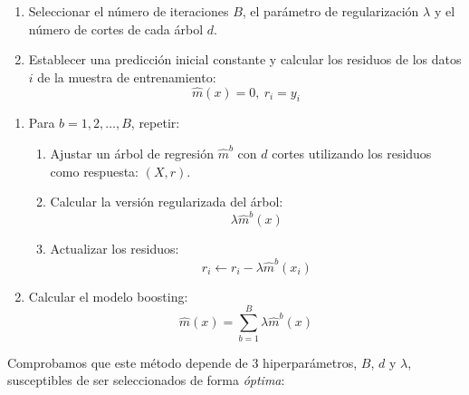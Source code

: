 \documentclass[
]{book}
\theoremstyle{break}
\theoremstyle{nonumberplain}
\begin{document}
\begin{enumerate}
\def\labelenumi{\arabic{enumi}.}
\item
  Seleccionar el número de iteraciones \(B\), el parámetro de regularización \(\lambda\) y el número de cortes de cada árbol \(d\).
\item
  Establecer una predicción inicial constante y calcular los residuos de los datos \(i\) de la muestra de entrenamiento: \[\hat m (x) = 0, \ r_i = y_i\]
\end{enumerate}

\begin{enumerate}
\def\labelenumi{\arabic{enumi}.}
\item
  Para \(b = 1, 2,\ldots, B\), repetir:

  \begin{enumerate}
  \def\labelenumii{\alph{enumii}.}
  \item
    Ajustar un árbol de regresión \(\hat m^b\) con \(d\) cortes utilizando los residuos como respuesta: \((X, r)\).
  \item
    Calcular la versión regularizada del árbol:
    \[\lambda \hat m^b (x)\]
  \item
    Actualizar los residuos:
    \[r_i \leftarrow r_i - \lambda \hat m^b (x_i)\]
  \end{enumerate}
\item
  Calcular el modelo boosting:
  \[\hat m (x) = \sum_{b=1}^{B} \lambda \hat m^b (x)\]
\end{enumerate}

Comprobamos que este método depende de 3 hiperparámetros, \(B\), \(d\) y \(\lambda\), susceptibles de ser seleccionados de forma \emph{óptima}:
\end{document}
